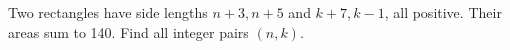 Two rectangles have side lengths $ n+3,n+5 $ and $ k+7,k-1 $, all positive. Their areas sum to 140. Find all integer pairs $(n,k)$.
